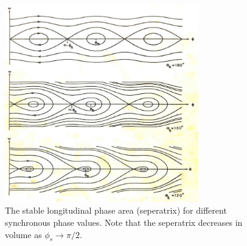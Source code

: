 \begin{figure}
\begin{center}
\includegraphics[width=0.75\textwidth]{appendices/figures/longPhaseDiag.png}
\end{center}
\caption{The stable longitudinal phase area (seperatrix) for different synchronous phase values. Note that the seperatrix decreases in volume as $\phi_{s} \rightarrow \pi / 2$.}
\label{fig:longSynFreq}
\end{figure}